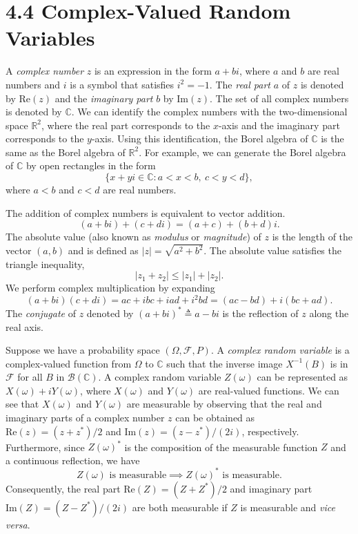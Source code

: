 \section*{4.4 Complex-Valued Random Variables}

A \textit{complex number} $z$ is an expression in the form $a + bi$, where $a$ and $b$ are real numbers and $i$ is a symbol that satisfies $i^2 = -1$. The \textit{real part} $a$ of $z$ is denoted by $\text{Re}(z)$ and the \textit{imaginary part} $b$ by $\text{Im}(z)$. The set of all complex numbers is denoted by $\mathbb{C}$. We can identify the complex numbers with the two-dimensional space $\mathbb{R}^2$, where the real part corresponds to the $x$-axis and the imaginary part corresponds to the $y$-axis. Using this identification, the Borel algebra of $\mathbb{C}$ is the same as the Borel algebra of $\mathbb{R}^2$. For example, we can generate the Borel algebra of $\mathbb{C}$ by open rectangles in the form
\[
\{x + yi \in \mathbb{C} : a < x < b, \ c < y < d\},
\]
where $a < b$ and $c < d$ are real numbers.

The addition of complex numbers is equivalent to vector addition.
\[
(a + bi) + (c + di) = (a + c) + (b + d)i.
\]
The absolute value (also known as \textit{modulus} or \textit{magnitude}) of $z$ is the length of the vector $(a, b)$ and is defined as $|z| = \sqrt{a^2 + b^2}$. The absolute value satisfies the triangle inequality,
\[
|z_1 + z_2| \le |z_1| + |z_2|.
\]
We perform complex multiplication by expanding
\[
(a + bi)(c + di) = ac + ibc + iad + i^2bd = (ac - bd) + i(bc + ad).
\]
The \textit{conjugate} of $z$ denoted by $(a + bi)^* \triangleq a - bi$ is the reflection of $z$ along the real axis.

Suppose we have a probability space $(\Omega, \mathcal{F}, P)$. A \textit{complex random variable} is a complex-valued function from $\Omega$ to $\mathbb{C}$ such that the inverse image $X^{-1}(B)$ is in $\mathcal{F}$ for all $B$ in $\mathcal{B}(\mathbb{C})$. A complex random variable $Z(\omega)$ can be represented as $X(\omega) + iY(\omega)$, where $X(\omega)$ and $Y(\omega)$ are real-valued functions. We can see that $X(\omega)$ and $Y(\omega)$ are measurable by observing that the real and imaginary parts of a complex number $z$ can be obtained as $\text{Re}(z) = (z + z^*)/2$ and $\text{Im}(z) = (z - z^*)/(2i)$, respectively. Furthermore, since $Z(\omega)^*$ is the composition of the measurable function $Z$ and a continuous reflection, we have
\[
Z(\omega) \text{ is measurable} \implies Z(\omega)^* \text{ is measurable}.
\]
Consequently, the real part $\text{Re}(Z) = (Z + Z^*)/2$ and imaginary part $\text{Im}(Z) = (Z - Z^*)/(2i)$ are both measurable if $Z$ is measurable and \textit{vice versa}.

